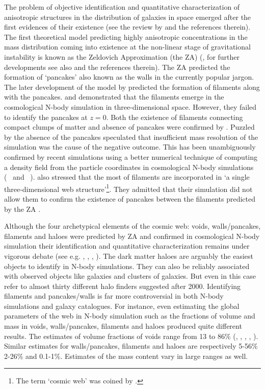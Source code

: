 The problem of objective identification and quantitative characterization of anisotropic structures 
in the distribution of galaxies in space emerged after the first evidences of their existence
(see the review by \citealt{Oort1983} and the references therein). The first theoretical model predicting highly anisotropic concentrations in the mass distribution coming into existence at the non-linear stage of gravitational instability is known as the Zeldovich Approximation (the ZA) (\citealt{Zeldovich1970}, for further developments see also \citealt{Shandarin1989} and the references therein). The ZA predicted the formation of  `pancakes'  also known as the walls in the currently popular jargon. The later development
of the model by \citet{Arnold1982} predicted the formation of filaments along with the pancakes. \citet{Klypin1983a} and \citet{Shandarin1984} demonstrated that the filaments emerge in the cosmological N-body simulation in three-dimensional space.
However, they failed to identify the pancakes at $z=0$. Both the existence of filaments connecting compact clumps of matter and absence of pancakes were confirmed by \citet{Frenk1983}. Puzzled by the absence of the pancakes \citet{Klypin1983a}
speculated that insufficient mass resolution of the simulation was the cause  of the negative outcome. 
This has been unambiguously confirmed by recent simulations using a better numerical technique of computing a density field from the particle
coordinates in cosmological N-body simulations (~\citealt{Shandarin2012} and ~\citealt{Abel2012}). \citealt{Klypin1983a} 
also stressed that the most of filaments are  incorporated in 
`a single three-dimensional web structure'\footnote{The term `cosmic web' was coined by  \citet{Bond1996}.}. 
They admitted that
their simulation did not allow them to confirm the existence of pancakes between the filaments predicted by the ZA \citep{Arnold1982}.

  
Although the four archetypical elements of the cosmic web:  voids, walls/pancakes, filaments and haloes 
were predicted by ZA and confirmed in cosmological N-body simulation their identification and quantitative characterization
remains under vigorous debate
(see e.g. \citealt{Colberg2008}, \citealt{Elahi2013}, \citealt{Knebe2013}, \citealt{Hoffmann2014}).
The dark matter haloes are arguably the easiest objects to identify in N-body simulations. They can also be reliably associated with
observed objects like galaxies and clusters of galaxies.  But even in this case \citet{Knebe2013} refer to almost thirty different
halo finders suggested after 2000. Identifying filaments and pancakes/walls is far more controversial in both N-body simulations 
and galaxy catalogues. For instance, even estimating the global parameters of the  web  in N-body simulation such as the fractions of volume and mass
in voids, walls/pancakes, filaments and haloes produced quite different results. The estimates of volume 
fractions of voids range from 13  to 86\%  (\citealt{Cautun2014a}, \citealt{Falck2015}, \citealt{Forero-Romero2009a} , \citealt{Hahn2007} , \citealt{Aragon-Calvo2010a}). Similar estimates for walls/pancakes, filaments 
and haloes  are respectively 5-56\% 2-26\% and 0.1-1\%.  Estimates of the mass content vary in large ranges as well.

